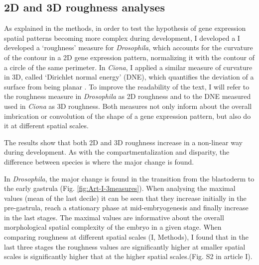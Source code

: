 \subsection{2D and 3D roughness analyses}
%
%
As explained in the methods, in order to test the hypothesis of gene expression spatial patterns becoming more complex during development, I developed a I developed a `roughness' measure \citep{Salvador-Martinez2015} for \textit{Drosophila}, which accounts for the curvature of the contour in a 2D gene expression pattern, normalizing it with the contour of a circle of the same perimeter.
In \textit{Ciona}, I applied a similar measure of curvature in 3D, called `Dirichlet normal energy' (DNE), which quantifies the deviation of a surface from being planar \citep{Bunn2011}. To improve the readability of the text,  I will refer to the roughness measure in \textit{Drosophila} as 2D roughness and to the DNE measured used in \textit{Ciona} as 3D roughness.
Both measures not only inform about the overall imbrication or convolution of the shape of a gene expression pattern, but also do it at different spatial scales.
%
%

The results show that both 2D and 3D roughness increase in a non-linear way during development.
As with the compartmentalization and disparity, the difference between species is where the major change is found. 

In \textit{Drosophila}, the major change is found in the transition from the blastoderm to the early gastrula (Fig. \ref{fig:Art-I-3measures}).
When analysing the maximal values (mean of the last decile) it can be seen that they increase initially in the pre-gastrula, reach a stationary phase at mid-embryogenesis and finally increase in the last stages. 
The maximal values are informative about the overall morphological spatial complexity of the embryo in a given stage.
When comparing roughness at different spatial scales (I, Methods), I found that in the last three stages the roughness values are significantly higher at smaller spatial scales is significantly higher that at the higher spatial scales.(Fig. S2 in article I). 

